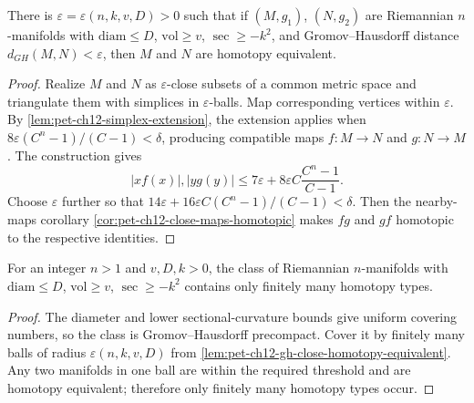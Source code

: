 \begin{lemma}
  \label{lem:pet-ch12-gh-close-homotopy-equivalent}

  There is $\varepsilon=\varepsilon(n,k,v,D)>0$ such that if $(M,g_1)$,
  $(N,g_2)$ are Riemannian $n$-manifolds with $\mathrm{diam}\le D$,
  $\mathrm{vol}\ge v$, $\sec\ge-k^2$, and Gromov--Hausdorff distance
  $d_{GH}(M,N)<\varepsilon$, then $M$ and $N$ are homotopy equivalent.
\end{lemma}
\begin{proof}
  \sketch
  Realize \(M\) and \(N\) as \(\varepsilon\)-close subsets of a common metric
  space and triangulate them with simplices in \(\varepsilon\)-balls. Map
  corresponding vertices within \(\varepsilon\). By
  \cref{lem:pet-ch12-simplex-extension}, the extension applies when
  \(8\varepsilon(C^n-1)/(C-1)<\delta\), producing compatible maps
  \(f:M\to N\) and \(g:N\to M\). The construction gives
  \[|xf(x)|,|yg(y)|\le7\varepsilon+8\varepsilon C\frac{C^n-1}{C-1}.\]
  Choose \(\varepsilon\) further so that
  \(14\varepsilon+16\varepsilon C(C^n-1)/(C-1)<\delta\). Then the nearby-maps
  corollary \cref{cor:pet-ch12-close-maps-homotopic} makes \(f g\) and
  \(g f\) homotopic to the respective identities.
\end{proof}

\begin{theorem}
  \label{thm:pet-ch12-homotopy-finiteness}

  For an integer $n>1$ and $v,D,k>0$, the class of Riemannian $n$-manifolds with
  $\mathrm{diam}\le D$, $\mathrm{vol}\ge v$, $\sec\ge-k^2$ contains only finitely
  many homotopy types.
\end{theorem}
\begin{proof}
  \sketch
  The diameter and lower sectional-curvature bounds give uniform covering
  numbers, so the class is Gromov--Hausdorff precompact. Cover it by finitely
  many balls of radius \(\varepsilon(n,k,v,D)\) from
  \cref{lem:pet-ch12-gh-close-homotopy-equivalent}. Any two manifolds in one
  ball are within the required threshold and are
  homotopy equivalent; therefore only finitely many homotopy types occur.
\end{proof}

